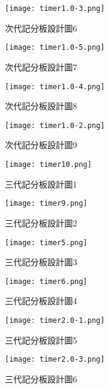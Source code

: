 \begin{figure}
  \centering
  \texttt{[image: timer1.0-3.png]}
  \caption{次代記分板設計圖6}
  \label{fig:example}
\end{figure}



\begin{figure}
  \centering
  \texttt{[image: timer1.0-5.png]}
  \caption{次代記分板設計圖7}
  \label{fig:example}
\end{figure}



\begin{figure}
  \centering
  \texttt{[image: timer1.0-4.png]}
  \caption{次代記分板設計圖8}
  \label{fig:example}
\end{figure}



\begin{figure}
  \centering
  \texttt{[image: timer1.0-2.png]}
  \caption{次代記分板設計圖9}
  \label{fig:example}
\end{figure}




\begin{figure}
  \centering
  \texttt{[image: timer10.png]}
  \caption{三代記分板設計圖1}
  \label{fig:example}
\end{figure}


\begin{figure}
  \centering
  \texttt{[image: timer9.png]}
  \caption{三代記分板設計圖2}
  \label{fig:example}
\end{figure}


\begin{figure}
  \centering
  \texttt{[image: timer5.png]}
  \caption{三代記分板設計圖3}
  \label{fig:example}
\end{figure}


\begin{figure}
  \centering
  \texttt{[image: timer6.png]}
  \caption{三代記分板設計圖4}
  \label{fig:example}
\end{figure}


\begin{figure}
  \centering
  \texttt{[image: timer2.0-1.png]}
  \caption{三代記分板設計圖5}
  \label{fig:example}
\end{figure}


\begin{figure}
  \centering
  \texttt{[image: timer2.0-3.png]}
  \caption{三代記分板設計圖6}
  \label{fig:example}
\end{figure}


